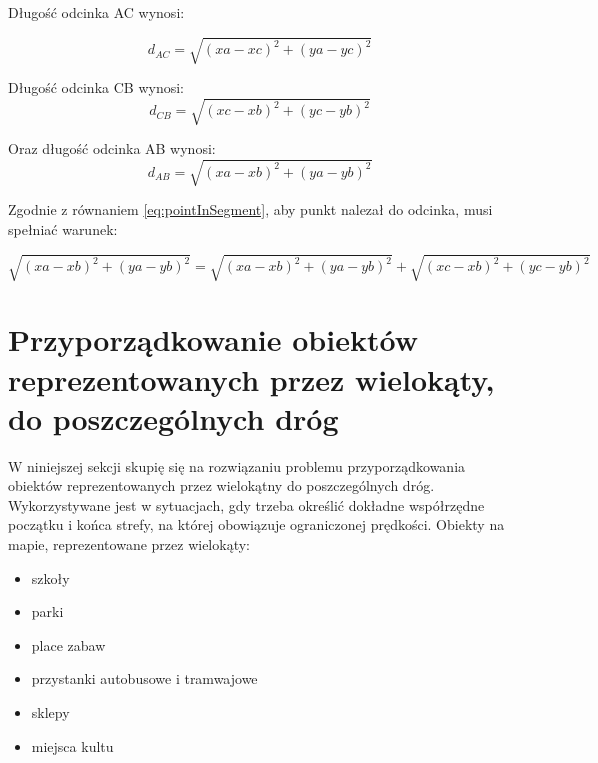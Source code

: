Długość odcinka AC wynosi:

\begin{equation} \label{eq:distanceBetweenTwoPointAC}
d_{AC} = \sqrt{(xa - xc)^2 + (ya - yc)^2}
\end{equation}\newline

Długość odcinka CB wynosi:
\begin{equation} \label{eq:distanceBetweenTwoPointCB}
d_{CB} = \sqrt{(xc - xb)^2 + (yc - yb)^2}
\end{equation}\newline

Oraz długość odcinka AB wynosi:
\begin{equation}
d_{AB} = \sqrt{(xa - xb)^2 + (ya - yb)^2}
\end{equation}\newline

Zgodnie z równaniem \ref{eq:pointInSegment}, aby punkt nalezał do odcinka, musi spełniać warunek:

\begin{equation}
\sqrt{(xa - xb)^2 + (ya - yb)^2} = \sqrt{(xa - xb)^2 + (ya - yb)^2} + \sqrt{(xc - xb)^2 + (yc - yb)^2}
\end{equation}\newline


\newpage
\section{Przyporządkowanie obiektów reprezentowanych przez wielokąty, do poszczególnych dróg}
\label{sec:polygonLineDistance}

W niniejszej sekcji skupię się na rozwiązaniu problemu przyporządkowania obiektów reprezentowanych przez wielokątny do poszczególnych dróg. Wykorzystywane jest w sytuacjach, gdy trzeba określić dokładne współrzędne początku i końca strefy, na której obowiązuje ograniczonej prędkości. Obiekty na mapie, reprezentowane przez wielokąty:
\begin{itemize}
\item szkoły
\item parki
\item place zabaw
\item przystanki autobusowe i tramwajowe
\item sklepy
\item miejsca kultu
\end{itemize}

